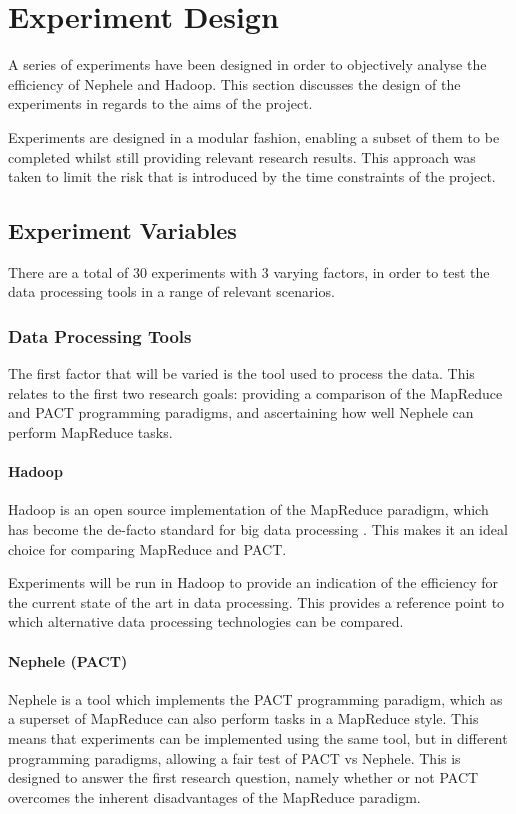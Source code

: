 \chapter{Experiment Design}
A series of experiments have been designed in order to objectively analyse the efficiency of Nephele and Hadoop. This section discusses the design of the experiments in regards to the aims of the project.

Experiments are designed in a modular fashion, enabling a subset of them to be completed whilst still providing relevant research results. This approach was taken to limit the risk that is introduced by the time constraints of the project. 

\section{Experiment Variables}
There are a total of 30 experiments with 3 varying factors, in order to test the data processing tools in a range of relevant scenarios. 

\subsection{Data Processing Tools}
The first factor that will be varied is the tool used to process the data. This relates to the first two research goals: providing a comparison of the MapReduce and PACT programming paradigms, and ascertaining how well Nephele can perform MapReduce tasks.

\subsubsection{Hadoop}
Hadoop is an open source implementation of the MapReduce paradigm, which has become the de-facto standard for big data processing \cite{qin2013reflection}. This makes it an ideal choice for comparing MapReduce and PACT.

Experiments will be run in Hadoop to provide an indication of the efficiency for the current state of the art in data processing. This provides a reference point to which alternative data processing technologies can be compared. 

\subsubsection{Nephele (PACT)}
Nephele is a tool which implements the PACT programming paradigm, which as a superset of MapReduce can also perform tasks in a MapReduce style. This means that experiments can be implemented using the same tool, but in different programming paradigms, allowing a fair test of PACT vs Nephele. This is designed to answer the first research question, namely whether or not PACT overcomes the inherent disadvantages of the MapReduce paradigm.

